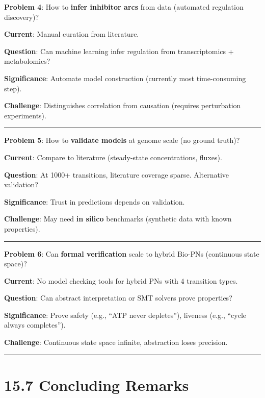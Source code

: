 \textbf{Problem 4}: How to \textbf{infer inhibitor arcs} from data
(automated regulation discovery)?

\textbf{Current}: Manual curation from literature.

\textbf{Question}: Can machine learning infer regulation from
transcriptomics + metabolomics?

\textbf{Significance}: Automate model construction (currently most
time-consuming step).

\textbf{Challenge}: Distinguishes correlation from causation (requires
perturbation experiments).

\begin{center}\rule{0.5\linewidth}{0.5pt}\end{center}

\textbf{Problem 5}: How to \textbf{validate models} at genome scale (no
ground truth)?

\textbf{Current}: Compare to literature (steady-state concentrations,
fluxes).

\textbf{Question}: At 1000+ transitions, literature coverage sparse.
Alternative validation?

\textbf{Significance}: Trust in predictions depends on validation.

\textbf{Challenge}: May need \textbf{in silico} benchmarks (synthetic
data with known properties).

\begin{center}\rule{0.5\linewidth}{0.5pt}\end{center}

\textbf{Problem 6}: Can \textbf{formal verification} scale to hybrid
Bio-PNs (continuous state space)?

\textbf{Current}: No model checking tools for hybrid PNs with 4
transition types.

\textbf{Question}: Can abstract interpretation or SMT solvers prove
properties?

\textbf{Significance}: Prove safety (e.g., ``ATP never depletes''),
liveness (e.g., ``cycle always completes'').

\textbf{Challenge}: Continuous state space infinite, abstraction loses
precision.

\begin{center}\rule{0.5\linewidth}{0.5pt}\end{center}

\hypertarget{concluding-remarks}{%
\section{15.7 Concluding Remarks}\label{concluding-remarks}}

